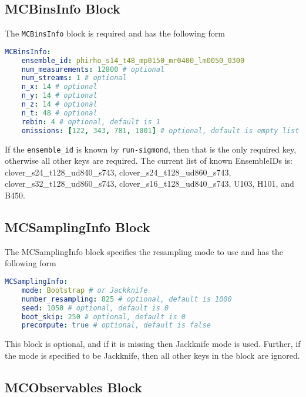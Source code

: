 \documentclass[12pt,letterpaper,notitlepage]{article}
\newcommand{\key}[1]{\textcolor{Emerald}{\texttt{\small{#1}}}}
\newcommand{\runsigmond}{\texttt{run-sigmond}}
\begin{document}
\subsection{MCBinsInfo Block}

The \key{MCBinsInfo} block is required and has the following form
\begin{lstlisting}[language=yaml]
  MCBinsInfo:
    ensemble_id: phirho_s14_t48_mp0150_mr0400_lm0050_0300
    num_measurements: 12800 # optional
    num_streams: 1 # optional
    n_x: 14 # optional
    n_y: 14 # optional
    n_z: 14 # optional
    n_t: 48 # optional
    rebin: 4 # optional, default is 1
    omissions: [122, 343, 781, 1001] # optional, default is empty list
\end{lstlisting}
If the \key{ensemble\_id} is known by \runsigmond{}, then that is the only required key, otherwise all other keys are required.
The current list of known EnsembleIDs is:
clover\_s24\_t128\_ud840\_s743, clover\_s24\_t128\_ud860\_s743, clover\_s32\_t128\_ud860\_s743, clover\_s16\_t128\_ud840\_s743, U103, H101, and B450.

\subsection{MCSamplingInfo Block}

The MCSamplingInfo block specifies the resampling mode to use and has the following form
\begin{lstlisting}[language=yaml]
  MCSamplingInfo:
    mode: Bootstrap # or Jackknife
    number_resampling: 825 # optional, default is 1000
    seed: 1050 # optional, default is 0
    boot_skip: 250 # optional, default is 0
    precompute: true # optional, default is false
\end{lstlisting}
This block is optional, and if it is missing then Jackknife mode is used.
Further, if the mode is specified to be Jackknife, then all other keys in the block are ignored.

\subsection{MCObservables Block}
\end{document}
